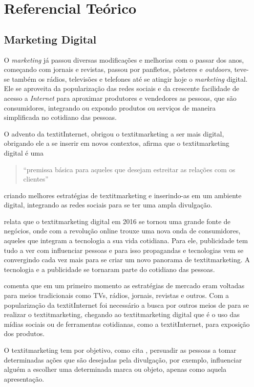 \chapter[Referencial Teórico]{Referencial Teórico}
\section{Marketing Digital}
O \textit{marketing} já passou diversas modificações e melhorias com o passar dos anos, começando com jornais e revistas, passou por panfletos, pôsteres e \textit{outdoors}, teve-se também os rádios, televisões e telefones até se atingir hoje o \textit{marketing} digital. Ele se aproveita da popularização das redes sociais e da crescente facilidade de acesso a \textit{Internet} para aproximar produtores e vendedores as pessoas, que são consumidores, integrando ou expondo produtos ou serviços de maneira simplificada no cotidiano das pessoas.

O advento da textit{Internet}, obrigou o textit{marketing} a ser mais digital, obrigando ele a se inserir em novos contextos, \cite{canto2017} afirma que o textit{marketing} digital é uma \begin{quote} ``premissa básica para aqueles que desejam estreitar as relações com os clientes''\end{quote} criando melhores estratégias de textit{marketing} e inserindo-as em um ambiente digital, integrando as redes sociais para se ter uma ampla divulgação.

\cite[p.2]{ryan2016} relata que o textit{marketing} digital em 2016 se tornou uma grande fonte de negócios, onde com a revolução online trouxe uma nova onda de consumidores, aqueles que integram a tecnologia a sua vida cotidiana. Para ele, publicidade tem tudo a ver com influenciar pessoas e para isso propagandas e tecnologias vem se convergindo cada vez mais para se criar um novo panorama de textit{marketing}. A tecnologia e a publicidade se tornaram parte do cotidiano das pessoas.

\cite{santos2014} comenta que em um primeiro momento as estratégias de mercado eram voltadas para meios tradicionais como TVs, rádios, jornais, revistas e outros. Com a popularização da textit{Internet} foi necessário a busca por outros meios de para se realizar
o textit{marketing}, chegando ao textit{marketing} digital que é o uso das mídias sociais ou de ferramentas cotidianas, como a textit{Internet}, para exposição dos produtos.

O textit{marketing} tem por objetivo, como cita \cite{ryan2016}, persuadir as pessoas a tomar determinadas ações que são desejadas pela divulgação, por exemplo, influenciar alguém a escolher uma determinada marca ou objeto, apenas como aquela apresentação.

